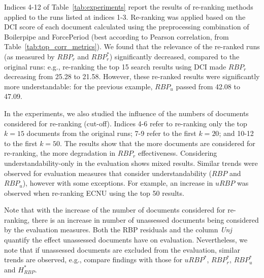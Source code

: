 

Indices 4-12 of Table~\ref{tab:experiments} report the results of re-ranking methods applied to the runs listed at indices 1-3. Re-ranking was applied based on the DCI score of each document calculated using the preprocessing combination of Boilerpipe and ForcePeriod (best according to Pearson correlation, from Table~\ref{tab:top_corr_metrics}).
We found that the relevance of the re-ranked runs (as measured by $RBP_r$ and $RBP_r^*$) significantly decreased, compared to the original runs: e.g., re-ranking the top 15 search results using DCI  made $RBP_r$ decreasing from 25.28 to 21.58. However, these re-ranked results were significantly more understandable: for the previous example, $RBP_u$ passed from 42.08 to 47.09.

In the experiments, we also studied the influence of the numbers of documents considered for re-ranking (cut-off). Indices 4-6 refer to re-ranking only the top $k=15$ documents from the original runs; 7-9 refer to the first $k=20$; and 10-12 to the first $k=50$. The results show that the more documents are considered for re-ranking, the more degradation in $RBP_r$ effectiveness. Considering understandability-only in the evaluation shows mixed results. Similar trends were observed for evaluation measures that consider understandability ($RBP$ and $RBP_u$), however with some exceptions. For example, an increase in $uRBP$ was observed when re-ranking ECNU using the top 50 results. 

Note that with the increase of the number of documents considered for re-ranking, there is an increase in number of unassessed documents being considered by the evaluation measures. Both the RBP residuals and the column \textit{Unj} quantify the effect unassessed documents have on evaluation. Nevertheless, we note that if unassessed documents are excluded from the evaluation, similar trends are observed, e.g., compare findings with those for $uRBP^*$, $RBP_r^*$, $RBP_u^*$ and $H_{RBP}^*$.


